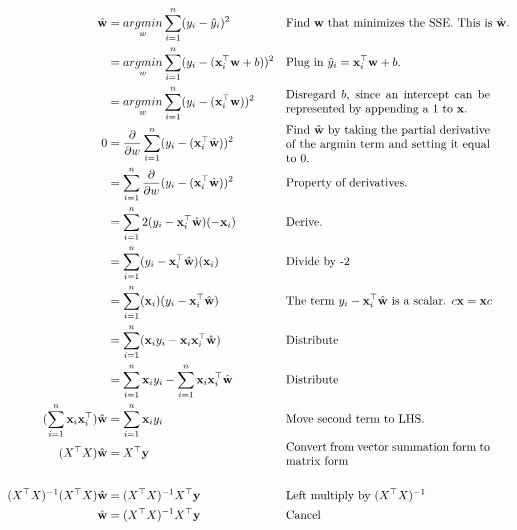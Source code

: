 \begin{flushleft}
    \begin{align*}
        \hat{\textbf{w}} &= \underset{w}{argmin} \sum_{i=1}^n (y_i - \hat{y}_i)^2 && \text{Find $\textbf{w}$ that minimizes the SSE. This is $\hat{\textbf{w}}$.}\\
        &= \underset{w}{argmin} \sum_{i=1}^n (y_i - (\textbf{x}_i^{\top}\textbf{w} + b))^2 && \text{Plug in $\hat{y}_i = \textbf{x}_i^{\top}\textbf{w} + b$.}\\
        &= \underset{w}{argmin} \sum_{i=1}^n (y_i - (\textbf{x}_i^{\top}\textbf{w}))^2 && \text{\parbox{0.5\textwidth}{Disregard $b$, since an intercept can be represented by appending a 1 to $\textbf{x}$.}}\\
        0 &= \frac{\partial}{\partial w} \sum_{i=1}^n (y_i - (\textbf{x}_i^{\top}\hat{\textbf{w}}))^2 && \text{\parbox{0.5\textwidth}{Find $\hat{\textbf{w}}$ by taking the partial derivative of the argmin term and setting it equal to 0.}}\\
        &= \sum_{i=1}^n \frac{\partial}{\partial w} (y_i - (\textbf{x}_i^{\top}\hat{\textbf{w}}))^2 && \text{Property of derivatives.}\\
        &= \sum_{i=1}^n 2(y_i - \textbf{x}_i^{\top}\hat{\textbf{w}})(-\textbf{x}_i) && \text{Derive.}\\
        &= \sum_{i=1}^n (y_i - \textbf{x}_i^{\top}\hat{\textbf{w}})(
        \textbf{x}_i) && \text{Divide by -2}\\
        &= \sum_{i=1}^n (
        \textbf{x}_i)(y_i - \textbf{x}_i^{\top}\hat{\textbf{w}}) && \text{The term $y_i - \textbf{x}_i^{\top}\hat{\textbf{w}}$ is a scalar. $c\textbf{x} = \textbf{x}c$}\\
        &= \sum_{i=1}^n (\textbf{x}_iy_i - \textbf{x}_i\textbf{x}_i^{\top}\hat{\textbf{w}}) && \text{Distribute}\\
        &= \sum_{i=1}^n \textbf{x}_iy_i - \sum_{i=1}^n \textbf{x}_i\textbf{x}_i^{\top}\hat{\textbf{w}} && \text{Distribute}\\
        (\sum_{i=1}^n \textbf{x}_i\textbf{x}_i^{\top})\hat{\textbf{w}} &= \sum_{i=1}^n \textbf{x}_iy_i && \text{Move second term to LHS.}\\
        (X^{\top}X)\hat{\textbf{w}} &= X^{\top}\textbf{y} && \text{\parbox{0.5\textwidth}{Convert from vector summation form to matrix form}}\\\\
        (X^{\top}X)^{-1}(X^{\top}X)\hat{\textbf{w}} &= (X^{\top}X)^{-1}X^{\top}\textbf{y} && \text{Left multiply by $(X^{\top}X)^{-1}$}\\
        \hat{\textbf{w}} &= (X^{\top}X)^{-1}X^{\top}\textbf{y} && \text{Cancel}\\
    \end{align*}


\end{flushleft}
